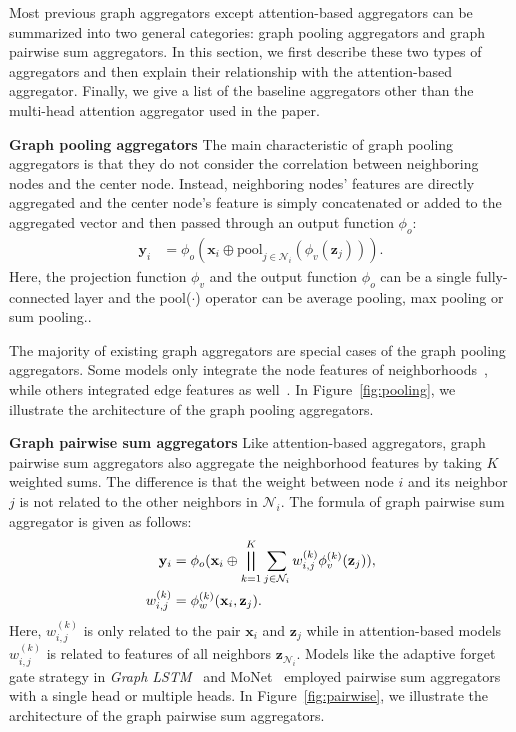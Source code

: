 \documentclass{article}
\begin{document}
	Most previous graph aggregators except attention-based aggregators can be summarized into two general categories: graph pooling aggregators and graph pairwise sum aggregators. In this section, we first describe these two types of aggregators and then explain their relationship with the attention-based aggregator. Finally, we give a list of the baseline aggregators other than the multi-head attention aggregator used in the paper.

\textbf{Graph pooling aggregators}\quad
	The main characteristic of graph pooling aggregators is that they do not consider the correlation between neighboring nodes and the center node. Instead, neighboring nodes' features are directly aggregated and the center node's feature is simply concatenated or added to the aggregated vector and then passed through an output function $\phi_o$:
	\begin{equation}
\begin{aligned}
	\mathbf{y}_i  &= \phi_o(\mathbf{x}_i \oplus \text{pool}_{j \in \mathcal{N}_i}(\phi_v(\mathbf{z}_j))).
	\end{aligned}
	\end{equation}
	Here, the projection function $\phi_v$ and the output function $\phi_o$ can be a single fully-connected layer and the pool($\cdot$) operator can be average pooling, max pooling or sum pooling..
	
	The majority of existing graph aggregators are special cases of the graph pooling aggregators. Some models only integrate the node features of neighborhoods~\citep{duvenaud2015convolutional,kipf2017semi,hamilton2017inductive}, while others integrated edge features as well~\citep{atwood2016diffusion,fout2017protein,schutt2017quantum}. In Figure~\ref{fig:pooling}, we illustrate the architecture of the graph pooling aggregators.

	
	
\textbf{Graph pairwise sum aggregators}\quad
	Like attention-based aggregators, graph pairwise sum aggregators also aggregate the neighborhood features by taking $K$ weighted sums. The difference is that the weight between node $i$ and its neighbor $j$ is not related to the other neighbors in $\mathcal{N}_i$. The formula of graph pairwise sum aggregator is given as follows:
	\begin{equation}
\begin{aligned}
	\mathbf{y}_i  &= \phi_o(\mathbf{x}_i \oplus \bigparallel_{k=1}^K  \sum_{j\in \mathcal{N}_i}w^{(k)}_{i, j} \phi_v^{(k)}(\mathbf{z}_j)),\\
	w_{i, j}^{(k)} &= \phi_w^{(k)} (\mathbf{x}_i, \mathbf{z}_j).
	\end{aligned}
	\end{equation}
Here, $w_{i,j}^{(k)}$ is only related to the pair $\mathbf{x}_i$ and $\mathbf{z}_j$ while in attention-based models $w_{i, j}^{(k)}$ is related to features of all neighbors $\mathbf{z}_{\mathcal{N}_i}$. 
	Models like the adaptive forget gate strategy in \emph{Graph LSTM}~\citep{liang2016semantic} and MoNet~\citep{monti2017geometric} employed pairwise sum aggregators with a single head or multiple heads. In Figure~\ref{fig:pairwise},  we illustrate the architecture of the graph pairwise sum aggregators.
	
\end{document}

